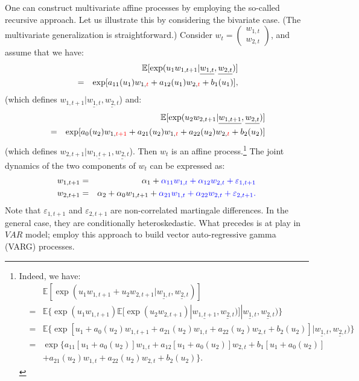 \documentclass[
  12pt,
]{book}
\theoremstyle{definition}
\theoremstyle{definition}
\theoremstyle{definition}
\theoremstyle{definition}
\theoremstyle{remark}
\begin{document}
One can construct multivariate affine processes by employing the so-called recursive approach. Let us illustrate this by considering the bivariate case. (The multivariate generalization is straightforward.) Consider \(w_t = \left(\begin{array}{c} w_{1,t}\\ w_{2,t} \end{array} \right)\), and assume that we have:
\begin{eqnarray*}
&&\mathbb{E}[\exp(u_1 w_{1,t+1}|\underline{w_{1,t}}, \underline{w_{2,t}})]\\
&=& \exp[a_{11}(u_1)w_{1,{\color{red}{t}}}+a_{12}(u_1)w_{2,{\color{red}{t}}}+b_{1}(u_1)],
\end{eqnarray*}
(which defines \(w_{1,t+1}|\underline{w_{1,t}}, \underline{w_{2,t}}\)) and:
\begin{eqnarray*}
&& \mathbb{E}[\exp(u_2 w_{2,t+1}|\underline{w_{1,t+1}}, \underline{w_{2,t}})]\\
&= & \exp[a_0(u_2)w_{1,{\color{red}{t+1}}}+a_{21}(u_2)w_{1,{\color{red}{t}}}+a_{22}(u_2)w_{2,{\color{red}{t}}}+b_2(u_2)]
\end{eqnarray*}
(which defines \(w_{2,t+1}|\underline{w_{1,t+1}}, \underline{w_{2,t}}\)). Then \(w_t\) is an affine process.\footnote{Indeed, we have:
  \begin{eqnarray*}
  && \mathbb{E}[\exp(u_1 w_{1,t+1}+u_2 w_{2,t+1}|\underline{w_{1,t}}, \underline{w_{2,t}})]\\
  &= & \mathbb{E}\{\exp(u_1 w_{1,t+1}) \mathbb{E}[\exp(u_{2}w_{2,t+1})|\underline{w_{1,t+1}}, \underline{w_{2,t}})]|\underline{w_{1,t}}, \underline{w_{2,t}})\} \\
  &= & \mathbb{E}\{\exp[u_1+a_0(u_2)w_{1,t+1}+a_{21}(u_2)w_{1,t} + a_{22}(u_2)w_{2,t}+b_2(u_2)]|\underline{w_{1,t}}, \underline{w_{2,t}})\} \\
  &= & \exp\{a_{11}[u_1+a_0(u_2)]w_{1,t}+a_{12}[u_1+a_0(u_2)]w_{2,t}+b_1[u_1+a_0(u_2)] \\
  &&+  a_{21}(u_2)w_{1,t}+a_{22}(u_2)w_{2,t}+b_2(u_2)\}.
  \end{eqnarray*}}
The joint dynamics of the two components of \(w_t\) can be expressed as:
\begin{eqnarray*}
w_{1,t+1} &=& \alpha_1 + \color{blue}{\alpha_{11}w_{1,t} + \alpha_{12}w_{2,t}} + \varepsilon_{1,t+1} \\
w_{2,t+1} &=& \alpha_2 + \alpha_{0}w_{1,t+1} + \color{blue}{\alpha_{21}w_{1,t} + \alpha _{22} w_{2,t}} + \varepsilon_{2,t+1}.
\end{eqnarray*}
Note that \(\varepsilon_{1,t+1}\) and \(\varepsilon_{2,t+1}\) are non-correlated martingale differences. In the general case, they are conditionally heteroskedastic. What precedes is at play in \(VAR\) model; \citet{zarg_2017} employ this approach to build vector auto-regressive gamma (VARG) processes.
\end{document}
